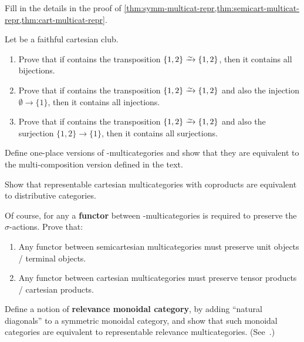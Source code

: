 \documentclass{book}
\begin{document}
\begin{ex}\label{ex:gen-multicat-repr}
  Fill in the details in the proof of \cref{thm:symm-multicat-repr,thm:semicart-multicat-repr,thm:cart-multicat-repr}.
\end{ex}

\begin{ex}\label{ex:club-generators}
  Let \fS be a faithful cartesian club.
  \begin{enumerate}
  \item Prove that if \fS contains the transposition $\{1,2\}\toiso \{1,2\}$, then it contains all bijections.
  \item Prove that if \fS contains the transposition $\{1,2\}\toiso \{1,2\}$ and also the injection $\emptyset \to \{1\}$, then it contains all injections.
  \item Prove that if \fS contains the transposition $\{1,2\}\toiso \{1,2\}$ and also the surjection $\{1,2\} \to \{1\}$, then it contains all surjections.
  \end{enumerate}
\end{ex}

\begin{ex}\label{ex:cartmulti-oneplace}
  Define one-place versions of \fS-multicategories and show that they are equivalent to the multi-composition version defined in the text.
\end{ex}

\begin{ex}\label{ex:distrib}
  Show that representable cartesian multicategories with coproducts are equivalent to distributive categories.
\end{ex}

\begin{ex}\label{ex:absolute}
  Of course, for any \fS a \textbf{functor} between \fS-multicategories is required to preserve the $\sigma$-actions.
  Prove that:
  \begin{enumerate}
  \item Any functor between semicartesian multicategories must preserve unit objects / terminal objects.
  \item Any functor between cartesian multicategories must preserve tensor products / cartesian products.
  \end{enumerate}
\end{ex}

\begin{ex}\label{ex:relevance-moncat}
  Define a notion of \textbf{relevance monoidal category}, by adding ``natural diagonals'' to a symmetric monoidal category, and show that such monoidal categories are equivalent to representable relevance multicategories.
  (See~\cite{dp:relevant-cats}.)
\end{ex}
\end{document}
